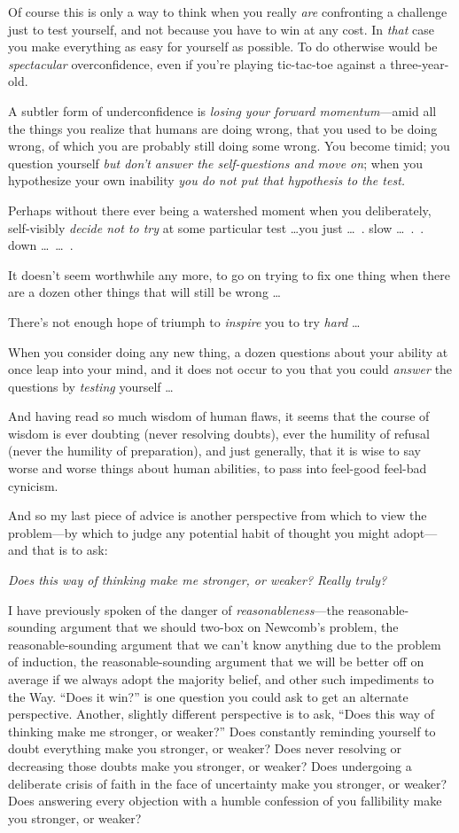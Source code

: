 {
 Of course this is only a way to think when you really \textit{are}
confronting a challenge just to test yourself, and not because you have
to win at any cost. In \textit{that} case you make everything as easy
for yourself as possible. To do otherwise would be \textit{spectacular}
overconfidence, even if you're playing tic-tac-toe
against a three-year-old.}

{
 A subtler form of underconfidence is \textit{losing your forward
momentum}{}---amid all the things you realize that humans are doing
wrong, that you used to be doing wrong, of which you are probably still
doing some wrong. You become timid; you question yourself \textit{but
don't answer the self-questions and move on}; when you
hypothesize your own inability \textit{you do not put that hypothesis
to the test.}}

{
 Perhaps without there ever being a watershed moment when you
deliberately, self-visibly \textit{decide not to try} at some
particular test \ldots you just \ldots~. slow \ldots~.~. down
\ldots~\ldots~.}

{
 It doesn't seem worthwhile any more, to go on
trying to fix one thing when there are a dozen other things that will
still be wrong \ldots}

{
 There's not enough hope of triumph to
\textit{inspire} you to try \textit{hard} \ldots}

{
 When you consider doing any new thing, a dozen questions about
your ability at once leap into your mind, and it does not occur to you
that you could \textit{answer} the questions by \textit{testing}
yourself \ldots}

{
 And having read so much wisdom of human flaws, it seems that the
course of wisdom is ever doubting (never resolving doubts), ever the
humility of refusal (never the humility of preparation), and just
generally, that it is wise to say worse and worse things about human
abilities, to pass into feel-good feel-bad cynicism.}

{
 And so my last piece of advice is another perspective from which
to view the problem---by which to judge any potential habit of thought
you might adopt---and that is to ask:}

{
 \textit{Does this way of thinking make me stronger, or weaker?
Really truly?}}

{
 I have previously spoken of the danger of
\textit{reasonableness}{}---the reasonable-sounding argument that we
should two-box on Newcomb's problem, the
reasonable-sounding argument that we can't know
anything due to the problem of induction, the reasonable-sounding
argument that we will be better off on average if we always adopt the
majority belief, and other such impediments to the Way.
``Does it win?'' is one question you
could ask to get an alternate perspective. Another, slightly different
perspective is to ask, ``Does this way of thinking
make me stronger, or weaker?'' Does constantly
reminding yourself to doubt everything make you stronger, or weaker?
Does never resolving or decreasing those doubts make you stronger, or
weaker? Does undergoing a deliberate crisis of faith in the face of
uncertainty make you stronger, or weaker? Does answering every
objection with a humble confession of you fallibility make you
stronger, or weaker?}

